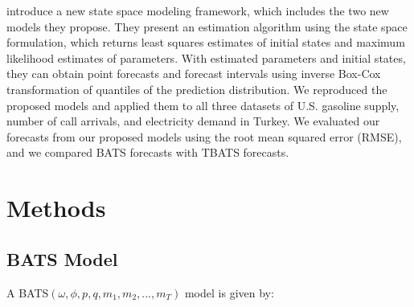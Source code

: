 \documentclass{uwstat572}
\begin{document}
\citet{de2011forecasting} introduce a new state space modeling framework, which includes the two new models they propose. They present an estimation algorithm using the state space formulation, which returns least squares estimates of initial states and maximum likelihood estimates of parameters. With estimated parameters and initial states, they can obtain point forecasts and forecast intervals using inverse Box-Cox transformation of quantiles of the prediction distribution. We reproduced the proposed models and  applied them to all three datasets of U.S. gasoline supply, number of call arrivals, and electricity demand in Turkey. We evaluated our forecasts from our proposed models using the root mean squared error (RMSE), and we compared BATS forecasts with TBATS forecasts.

\section{Methods}
\subsection{BATS Model}

\hspace{4ex}A BATS$( \omega, \phi, p, q, m_1, m_2, ..., m_T )$ model is given by:  
\end{document}
